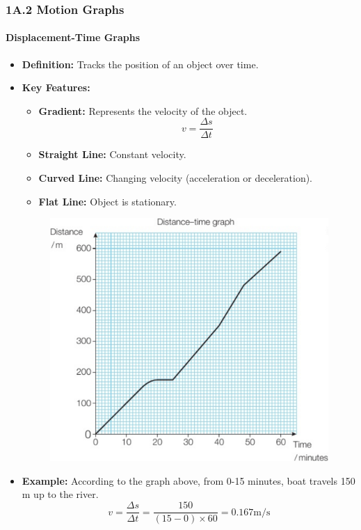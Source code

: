 
\subsubsection{1A.2 Motion Graphs}
\paragraph{Displacement-Time Graphs}
\begin{itemize}
    \item \textbf{Definition:} Tracks the position of an object over time.
    \item \textbf{Key Features:}
    \begin{itemize}
        \item \textbf{Gradient:} Represents the velocity of the object.
        \begin{equation}
            v = \frac{\Delta s}{\Delta t}
        \end{equation}
        \item \textbf{Straight Line:} Constant velocity.
        \item \textbf{Curved Line:} Changing velocity (acceleration or deceleration).
        \item \textbf{Flat Line:} Object is stationary.
    \end{itemize}
    \begin{figure}[H]
        \centering
        \includegraphics[scale=0.15]{Physics/1A/Images/1A-2-1.png}
    \end{figure}
    \item \textbf{Example:} According to the graph above, from 0-15 minutes, boat travels 150 m up to the river.
    \begin{equation}
        v = \frac{\Delta s}{\Delta t} = \frac{150}{\left(15 - 0\right) \times 60} = 0.167 \text{m/s}
    \end{equation}
\end{itemize}

